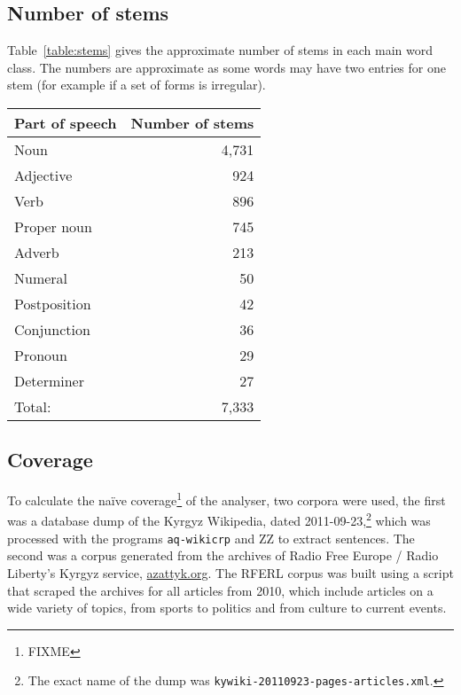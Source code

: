 \documentclass[10pt,a4paper,twocolumn]{article}
\begin{document}
\subsection{Number of stems}

Table~\ref{table:stems} gives the approximate number of stems in each main word class. The numbers
are approximate as some words may have two entries for one stem (for example if a set of forms
is irregular).

\begin{table*}
	\centering
	\begin{tabular}{lr}
		\toprule
		Part of speech & Number of stems\\
		\midrule
		Noun & 4,731\\
		Adjective & 924\\
		Verb & 896 \\
		Proper noun & 745\\
		Adverb & 213\\
		Numeral & 50\\
		Postposition & 42\\
		Conjunction & 36\\
		Pronoun & 29\\
		Determiner & 27\\
		\midrule
		Total:     & 7,333\\
		\bottomrule
	\end{tabular}
	\caption{FIXME}\label{table:stems}
\end{table*}


\subsection{Coverage}

To calculate the naïve coverage\footnote{FIXME} of the analyser, two corpora were used, the first was a database dump of the Kyrgyz Wikipedia, dated 2011-09-23,\footnote{The exact name of the dump was \texttt{kywiki-20110923-pages-articles.xml}.} which was processed with the programs \texttt{aq-wikicrp} and ZZ to extract sentences. The second was a corpus generated from the archives of Radio Free Europe / Radio Liberty's Kyrgyz service, \href{http://www.azattyk.org}{azattyk.org}.  The RFERL corpus was built using a script that scraped the archives for all articles from 2010, which include articles on a wide variety of topics, from sports to politics and from culture to current events.
\end{document}
